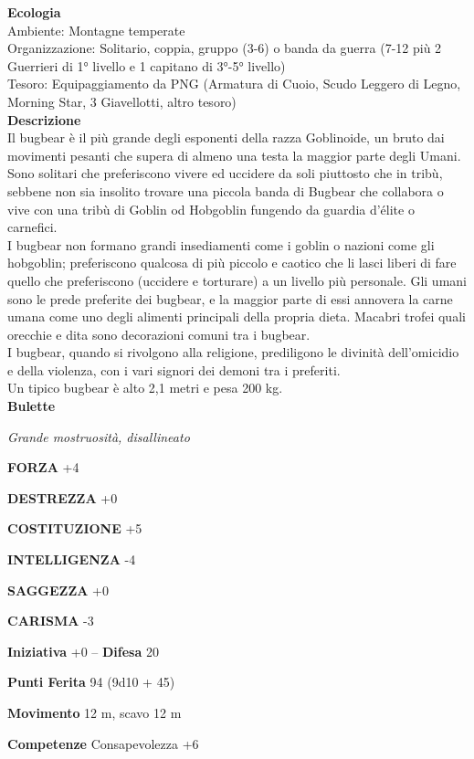 \begin{multicols}{2}
\textbf{Ecologia}\\
Ambiente: Montagne temperate\\
Organizzazione: Solitario, coppia, gruppo (3-6) o banda da guerra (7-12 più 2 Guerrieri di 1° livello e 1 capitano di 3°-5° livello)\\
Tesoro: Equipaggiamento da PNG (Armatura di Cuoio, Scudo Leggero di Legno, Morning Star, 3 Giavellotti, altro tesoro)\\
\textbf{Descrizione}\\
Il bugbear è il più grande degli esponenti della razza Goblinoide, un bruto dai movimenti pesanti che supera di almeno una testa la maggior parte degli Umani. Sono solitari che preferiscono vivere ed uccidere da soli piuttosto che in tribù, sebbene non sia insolito trovare una piccola banda di Bugbear che collabora o vive con una tribù di Goblin od Hobgoblin fungendo da guardia d'élite o carnefici.\\
I bugbear non formano grandi insediamenti come i goblin o nazioni come gli hobgoblin; preferiscono qualcosa di più piccolo e caotico che li lasci liberi di fare quello che preferiscono (uccidere e torturare) a un livello più personale. Gli umani sono le prede preferite dei bugbear, e la maggior parte di essi annovera la carne umana come uno degli alimenti principali della propria dieta. Macabri trofei quali orecchie e dita sono decorazioni comuni tra i bugbear.\\
I bugbear, quando si rivolgono alla religione, prediligono le divinità dell'omicidio e della violenza, con i vari signori dei demoni tra i preferiti.\\
Un tipico bugbear è alto 2,1 metri e pesa 200 kg.\\


\medskip{}\textbf{Bulette}

\emph{Grande mostruosità, disallineato}

\textbf{FORZA} +4

\textbf{DESTREZZA} +0

\textbf{COSTITUZIONE} +5

\textbf{INTELLIGENZA} -4

\textbf{SAGGEZZA} +0

\textbf{CARISMA} -3

\textbf{Iniziativa} +0 -- \textbf{Difesa} 20

\textbf{Punti Ferita} 94 (9d10 + 45)

\textbf{Movimento} 12 m, scavo 12 m

\textbf{Competenze} Consapevolezza +6


\end{multicols}
